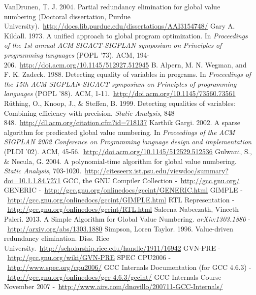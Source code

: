 \cleardoublepage
{}
{}
\begin{thebibliography}{99}

	VanDrunen, T. J. 2004. Partial redundancy elimination for global value numbering (Doctoral dissertation, Purdue University).\ \url{http://docs.lib.purdue.edu/dissertations/AAI3154748/}
Gary A. Kildall. 1973. A unified approach to global program optimization. In \emph{Proceedings of the 1st annual ACM SIGACT-SIGPLAN symposium on Principles of programming languages} (POPL '73). ACM, 194-206.\ \url{http://doi.acm.org/10.1145/512927.512945}
B. Alpern, M. N. Wegman, and F. K. Zadeck. 1988. Detecting equality of variables in programs. In \emph{Proceedings of the 15th ACM SIGPLAN-SIGACT symposium on Principles of programming languages} (POPL '88). ACM, 1-11.\ \url{http://doi.acm.org/10.1145/73560.73561}
R\"uthing, O., Knoop, J., \& Steffen, B. 1999. Detecting equalities of variables: Combining efficiency with precision. \emph{Static Analysis}, 848-848.\ \url{http://dl.acm.org/citation.cfm?id=718137}
Karthik Gargi. 2002. A sparse algorithm for predicated global value numbering. In \emph{Proceedings of the ACM SIGPLAN 2002 Conference on Programming language design and implementation} (PLDI '02). ACM, 45-56.\ \url{http://doi.acm.org/10.1145/512529.512536}
Gulwani, S., \& Necula, G. 2004. A polynomial-time algorithm for global value numbering. \emph{Static Analysis}, 703-1020.\ \url{http://citeseerx.ist.psu.edu/viewdoc/summary?doi=10.1.1.84.7271}
GCC, the GNU Compiler Collection -\ \url{http://gcc.gnu.org/}
GENERIC -\ \url{http://gcc.gnu.org/onlinedocs/gccint/GENERIC.html}
GIMPLE -\ \url{http://gcc.gnu.org/onlinedocs/gccint/GIMPLE.html}
RTL Representation -\ \url{http://gcc.gnu.org/onlinedocs/gccint/RTL.html}
Saleena Nabeezath, Vineeth Paleri. 2013. A Simple Algorithm for Global Value Numbering. \emph{arXiv:1303.1880} -\ \url{http://arxiv.org/abs/1303.1880}
Simpson, Loren Taylor. 1996. Value-driven redundancy elimination. Diss. Rice University.\ \url{http://scholarship.rice.edu/handle/1911/16942}
GVN-PRE -\ \url{http://gcc.gnu.org/wiki/GVN-PRE}
SPEC CPU2006 -\ \url{http://www.spec.org/cpu2006/}
GCC Internals Documentation (for GCC 4.6.3) -\ \url{http://gcc.gnu.org/onlinedocs/gcc-4.6.3/gccint/}
GCC Internals Course - November 2007 -\ \url{http://www.airs.com/dnovillo/200711-GCC-Internals/}

\end{thebibliography}
